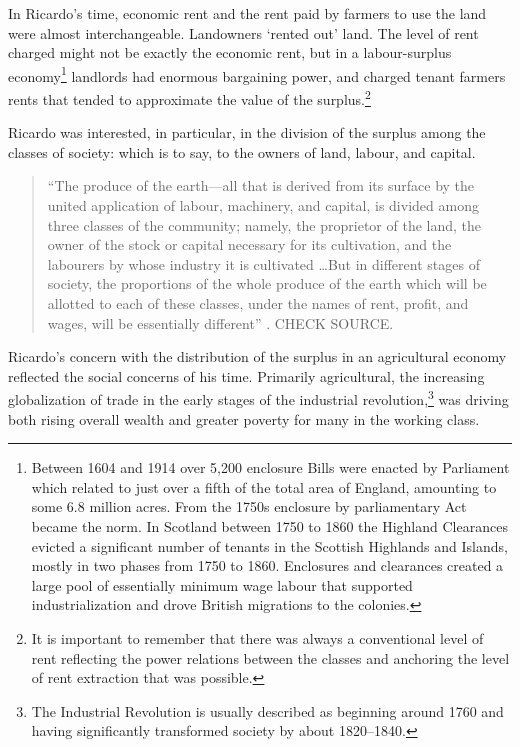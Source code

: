 In Ricardo's time, economic rent and the rent paid by farmers to use the land were almost interchangeable. Landowners `rented out' land. The level of rent charged might not be exactly the economic rent, but in a labour-surplus economy\footnote{Between 1604 and 1914 over 5,200 enclosure Bills were enacted by Parliament which related to just over a fifth of the total area of England, amounting to some 6.8 million acres. From the 1750s enclosure by parliamentary Act became the norm. In Scotland  between 1750 to 1860 the  Highland Clearances  evicted a significant number of tenants in the Scottish Highlands and Islands, mostly in two phases from 1750 to 1860. Enclosures and clearances created a large pool of essentially minimum wage labour that supported industrialization and drove British migrations to the colonies.} landlords had enormous bargaining power, and charged tenant farmers rents that tended to approximate the value of the \gls{surplus}.\footnote{It is important to remember that there was always a conventional level of rent reflecting the power relations between the classes and anchoring the level of rent extraction that was possible.} 


Ricardo was interested, in particular, in the division of the surplus among the classes of society:  which is to say, to the owners of land, labour, and capital.\begin{quotation}
 ``The produce of the earth---all that is derived from its surface by the united application of labour, machinery, and capital, is divided among three classes of the community; namely, the proprietor of the land, the owner of the stock or capital necessary for its cultivation, and the labourers by whose industry it is cultivated \dots  But in different stages of society, the proportions of the whole produce of the earth which will be allotted to each of these classes, under the names of rent, profit, and wages, will be essentially different''  \cite{ricardoEssayInfluenceLow1815}. CHECK SOURCE.
\end{quotation}
Ricardo's concern with the distribution of the surplus in an agricultural economy reflected the social concerns of his time. Primarily agricultural, the increasing globalization of trade in the early stages of the industrial revolution,\footnote{The Industrial Revolution is usually described as beginning around 1760 and having significantly transformed society by about 1820--1840.} was driving both rising overall wealth and greater poverty for many in the working class.

